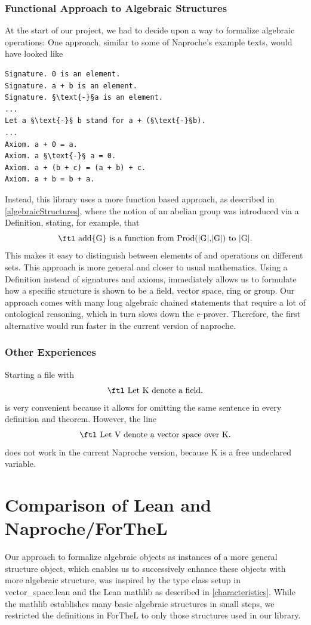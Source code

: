 \documentclass[11pt]{article}
\begin{document}
\subsubsection{Functional Approach to Algebraic Structures} \label{functionalapproach}
At the start of our project, we had to decide upon a way to formalize algebraic operations:
One approach, similar to some of Naproche's example texts, would have looked like
\begin{lstlisting}
Signature. 0 is an element.
Signature. a + b is an element.
Signature. §\text{-}§a is an element.
...
Let a §\text{-}§ b stand for a + (§\text{-}§b).
...
Axiom. a + 0 = a.
Axiom. a §\text{-}§ a = 0.
Axiom. a + (b + c) = (a + b) + c.
Axiom. a + b = b + a.
\end{lstlisting}

Instead, this library uses a more function based approach, as described in \ref{algebraicStructures}, where the notion of an abelian group was introduced via a {\ftl Definition}, stating, for example, that
$$\text{\ftl add\{G\} is a function from Prod(|G|,|G|) to |G|.}$$
This makes it easy to distinguish between elements of and operations on different sets.
This approach is more general and closer to usual mathematics. Using a {\ftl Definition} instead of signatures and axioms, immediately allows us to formulate how a specific structure is shown to be a field, vector space, ring or group.
Our approach comes with many long algebraic chained statements that require a lot of ontological reasoning, which in turn slows down the e-prover. Therefore, the first alternative would run faster in the current version of naproche.

\subsubsection{Other Experiences}
Starting a file with
$$\text{\ftl Let K denote a field.}$$
is very convenient because it allows for omitting the same sentence in every definition and theorem.
However, the line
$$\text{\ftl Let V denote a vector space over K.}$$
does not work in the current Naproche version, because {\ftl K} is a free undeclared variable.


\newpage
\section{Comparison of Lean and Naproche/ForTheL}
Our approach to formalize algebraic objects as instances of a more general {\ftl structure} object, which enables us to successively enhance these objects with more algebraic structure, was inspired by the type class setup in vector\_space.lean and the Lean mathlib as described in \ref{characteristics}.
While the mathlib establishes many basic algebraic structures in small steps, we restricted the definitions in ForTheL to only those structures used in our library.
\end{document}
